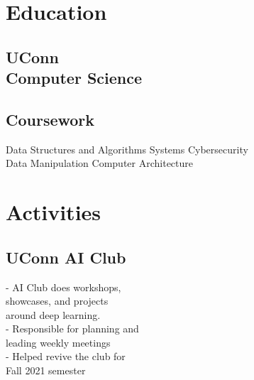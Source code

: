 \documentclass[]{resume-template}
\begin{document}
%
%
\lastupdated{}

%
%

%
%

\begin{minipage}[t]{0.33\textwidth}


    \section{Education}\label{sec:education}

    \subsection{UConn\\ Computer Science}%
    \vspace{\topsep}
    \subsection{Coursework}\label{subsec:coursework}
    Data Structures and Algorithms %
    Systems \textbullet{} Cybersecurity \textbullet{} \\
    Data Manipulation \textbullet{}  Computer Architecture
    \sectionsep{}




    \section{Activities}\label{sec:activities}

    \subsection{UConn AI Club}\label{subsec:uconn-ai-club}
    - AI Club does workshops,\\showcases, and projects \\around deep learning.\\
    - Responsible for planning and\\ leading weekly meetings\\
    - Helped revive the club for \\ Fall 2021 semester



\end{minipage}
\end{document}
